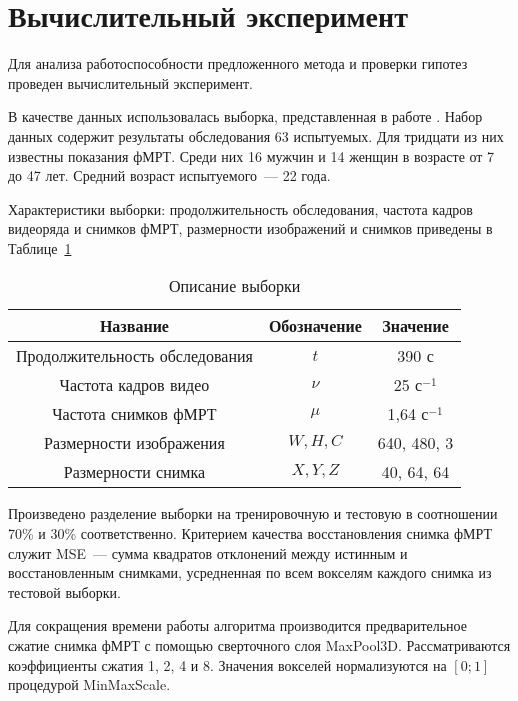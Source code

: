 \documentclass[a4paper, 12pt]{extarticle}
\begin{document}
\section{Вычислительный эксперимент}

Для анализа работоспособности предложенного метода и проверки гипотез
проведен вычислительный эксперимент.

В качестве данных использовалась выборка, представленная в работе \citep{Berezutskaya2022}.
Набор данных содержит результаты обследования 63 испытуемых.
Для тридцати из них известны показания фМРТ.
Среди них 16 мужчин и 14 женщин в возрасте от 7 до 47 лет.
Средний возраст испытуемого~--- 22 года.

Характеристики выборки: продолжительность обследования,
частота кадров видеоряда и снимков фМРТ, размерности изображений
и снимков приведены в Таблице~\ref{table:sample}

\begin{table}[h!]
	\centering
	\caption{Описание выборки}
	\begin{tabular}{|c|c|c|}
		\hline
		Название                       & Обозначение & Значение             \\
		\hline \hline
		Продолжительность обследования & $t$         & 390 с                \\ \hline
		Частота кадров видео           & $\nu$       & 25 $\text{с}^{-1}$   \\ \hline
		Частота снимков фМРТ           & $\mu$       & 1,64 $\text{с}^{-1}$ \\ \hline
		Размерности изображения        & $W, H, C$   & 640, 480, 3          \\ \hline
		Размерности снимка             & $X, Y, Z$   & 40, 64, 64           \\ \hline
	\end{tabular}
	\label{table:sample}
\end{table}

Произведено разделение выборки на тренировочную и тестовую в соотношении 70\% и 30\% соответственно.
Критерием качества восстановления снимка фМРТ служит MSE~--- сумма квадратов отклонений
между истинным и восстановленным снимками, усредненная по всем вокселям каждого снимка
из тестовой выборки.

Для сокращения времени работы алгоритма производится предварительное сжатие снимка фМРТ
с помощью сверточного слоя MaxPool3D. Рассматриваются коэффициенты сжатия 1, 2, 4 и 8.
Значения вокселей нормализуются на $[0; 1]$ процедурой MinMaxScale.
\end{document}
